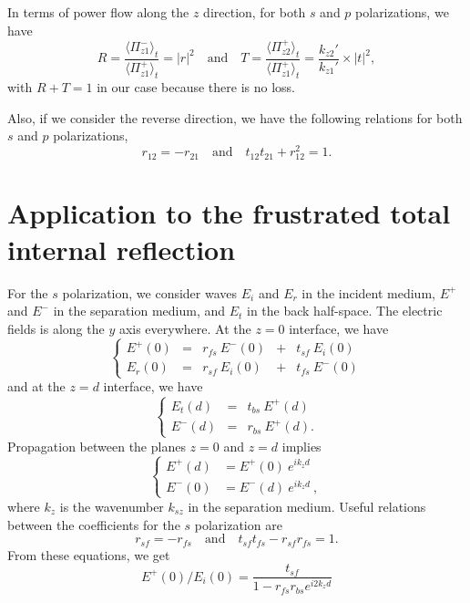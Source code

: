 In terms of power flow along the $z$ direction, for both $s$ and $p$ polarizations, we have
$$
R = \frac{\langle \Pi_{z1}^- \rangle_t}{\langle \Pi_{z1}^+ \rangle_t}
= |r|^2
\quad\textrm{and}\quad
T = \frac{\langle \Pi_{z2}^+ \rangle_t}{\langle \Pi_{z1}^+ \rangle_t} 
= \frac{k_{z2}'}{k_{z1}'} \times |t|^2,
$$
with $R+T=1$ in our case because there is no loss.

Also, if we consider the reverse direction, we have the following relations for both $s$ and $p$ polarizations,
$$ 
r_{12} = - r_{21} 
\quad\textrm{and}\quad
t_{12} t_{21} + r_{12}^2 = 1.
$$


\section{Application to the frustrated total internal reflection}

For the $s$ polarization, we consider waves $E_i$ and $E_r$ in the incident medium, $E^+$ and $E^-$ in the separation medium, and $E_t$ in the back half-space.
The electric fields is along the $y$ axis everywhere.
At the $z=0$ interface, we have
\begin{equation*}
\left\{
\begin{array}{lllll}\label{eq:continuity0}
E^+(0)  & = & r_{fs}\ E^-(0)  & + & t_{sf}\ E_i(0)    \\
E_r(0)  & = & r_{sf}\ E_i(0)  & + & t_{fs}\ E^-(0)
\end{array}\right.
\end{equation*}
and at the $z=d$ interface, we have
\begin{equation*}
\left\{
\begin{array}{lll}\label{eq:continuityd}
E_t(d)  & = & t_{bs}\ E^+(d)  \\
E^-(d)  & = & r_{bs}\ E^+(d).
\end{array}\right.
\end{equation*}
Propagation between the planes $z=0$ and $z=d$ implies
\begin{equation*}
\left\{
\begin{array}{lll}\label{eq:0tod}
E^+(d) & = E^+(0)\ e^{ik_z d}\\
E^-(0) & = E^-(d)\ e^{ik_z d} \ ,
\end{array}\right.
\end{equation*}
where $k_z$ is the wavenumber $k_{sz}$ in the separation medium.
Useful relations between the coefficients for the $s$ polarization are 
$$ 
r_{sf} = - r_{fs} 
\quad\textrm{and}\quad
t_{sf} t_{fs} - r_{sf} r_{fs} = 1. 
$$
From these equations, we get
\begin{equation*}
E^+(0) / E_i(0) =\frac{t_{sf}}{1 - r_{fs}r_{bs}e^{i2k_z d}}
\end{equation*}

